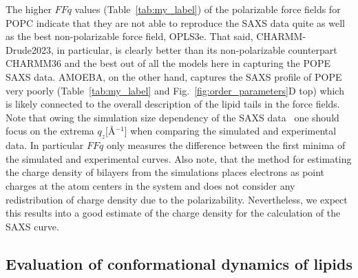 \documentclass[journal=jacsat,manuscript=article,layout=singlecolumn]{achemso}
\begin{document}
The higher $FFq$ values (Table~\ref{tab:my_label}) of the polarizable force fields for POPC indicate that they are not able to reproduce the SAXS data quite as well as the best non-polarizable force field, OPLS3e. That said, CHARMM-Drude2023, in particular, is clearly better than its non-polarizable counterpart CHARMM36 and the best out of all the models here in capturing the POPE SAXS data. AMOEBA, on the other hand, captures the SAXS profile of POPE very poorly (Table~\ref{tab:my_label} and Fig.~\ref{fig:order_parameters}D top) which is likely connected to the overall description of the lipid tails in the force fields. Note that owing the simulation size dependency of the SAXS data~\cite{Databank} one should focus on the extrema $q_{z}$[\AA$^{-1}$] when comparing the simulated and experimental data. In particular $FFq$ only measures the difference between the first minima of the simulated and experimental curves. Also note, that the method for estimating the charge density of bilayers from the simulations places electrons as point charges at the atom centers in the system and does not consider any redistribution of charge density due to the polarizability. Nevertheless, we expect this results into a good estimate of the charge density for the calculation of the SAXS curve.

\subsection{Evaluation of conformational dynamics of lipids}
\end{document}

